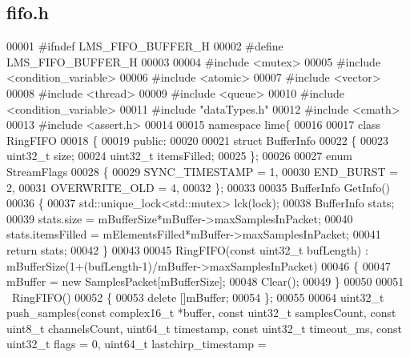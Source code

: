 \subsection{fifo.\+h}
\label{fifo_8h_source}

\begin{DoxyCode}
00001 \textcolor{preprocessor}{#ifndef LMS\_FIFO\_BUFFER\_H}
00002 \textcolor{preprocessor}{#define LMS\_FIFO\_BUFFER\_H}
00003 
00004 \textcolor{preprocessor}{#include <mutex>}
00005 \textcolor{preprocessor}{#include <condition\_variable>}
00006 \textcolor{preprocessor}{#include <atomic>}
00007 \textcolor{preprocessor}{#include <vector>}
00008 \textcolor{preprocessor}{#include <thread>}
00009 \textcolor{preprocessor}{#include <queue>}
00010 \textcolor{preprocessor}{#include <condition\_variable>}
00011 \textcolor{preprocessor}{#include "dataTypes.h"}
00012 \textcolor{preprocessor}{#include <cmath>}
00013 \textcolor{preprocessor}{#include <assert.h>}
00014 
00015 \textcolor{keyword}{namespace }lime\{
00016 
00017 \textcolor{keyword}{class }RingFIFO
00018 \{
00019 \textcolor{keyword}{public}:
00020 
00021     \textcolor{keyword}{struct }BufferInfo
00022     \{
00023         uint32\_t size;
00024         uint32\_t itemsFilled;
00025     \};
00026 
00027     \textcolor{keyword}{enum} StreamFlags
00028     \{
00029         SYNC_TIMESTAMP = 1,
00030         END_BURST = 2,
00031         OVERWRITE_OLD = 4,
00032     \};
00033 
00035     BufferInfo GetInfo()
00036     \{
00037         std::unique\_lock<std::mutex> lck(lock);
00038         BufferInfo stats;
00039         stats.size = mBufferSize*mBuffer->maxSamplesInPacket;
00040         stats.itemsFilled = mElementsFilled*mBuffer->maxSamplesInPacket;
00041         \textcolor{keywordflow}{return} stats;
00042     \}
00043 
00045     RingFIFO(\textcolor{keyword}{const} uint32\_t bufLength) : mBufferSize(1+(bufLength-1)/mBuffer->maxSamplesInPacket)
00046     \{
00047         mBuffer = \textcolor{keyword}{new} SamplesPacket[mBufferSize];
00048         Clear();
00049     \}
00050 
00051     ~RingFIFO()
00052     \{
00053         \textcolor{keyword}{delete} []mBuffer;
00054     \};
00055 
00064     uint32\_t push_samples(\textcolor{keyword}{const} complex16_t *buffer, \textcolor{keyword}{const} uint32\_t samplesCount, \textcolor{keyword}{const} uint8\_t 
      channelsCount, uint64\_t timestamp, \textcolor{keyword}{const} uint32\_t timeout_ms, \textcolor{keyword}{const} uint32\_t flags = 0, uint64\_t lastchirp\_timestamp = 

\end{DoxyCode}
